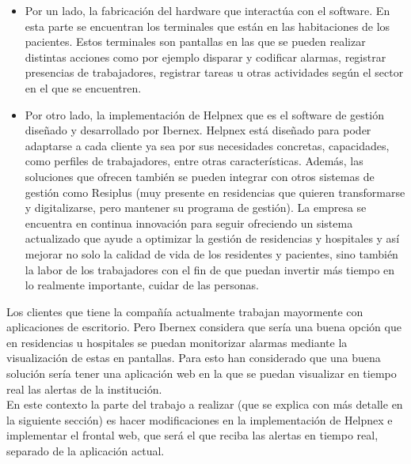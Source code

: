\begin{itemize}
    \item Por un lado, la fabricación del hardware que interactúa con el software. En esta parte se encuentran los terminales que están en las habitaciones de los pacientes. Estos terminales son pantallas en las que se pueden realizar distintas acciones como por ejemplo disparar y codificar alarmas, registrar presencias de trabajadores, registrar tareas u otras actividades según el sector en el que se encuentren.
    \item Por otro lado, la implementación de Helpnex que es el software de gestión diseñado y desarrollado por Ibernex. Helpnex está diseñado para poder adaptarse a cada cliente ya sea por sus necesidades concretas, capacidades, como perfiles de trabajadores, entre otras características.
    Además, las soluciones que ofrecen también se pueden integrar con otros sistemas de gestión como Resiplus (muy presente en residencias que quieren transformarse y digitalizarse, pero mantener su programa de gestión). 
    La empresa se encuentra en continua innovación para seguir ofreciendo un sistema actualizado que ayude a optimizar la gestión de residencias y hospitales y así mejorar no solo la calidad de vida de los residentes y pacientes, sino también la labor de los trabajadores con el fin de que puedan invertir más tiempo en lo realmente importante, cuidar de las personas.
\end{itemize}



Los clientes que tiene la compañía actualmente trabajan mayormente con aplicaciones de escritorio. Pero Ibernex considera que sería una buena opción que en residencias u hospitales se puedan monitorizar alarmas mediante la visualización de estas en pantallas. Para esto han considerado que una buena solución sería tener una aplicación web en la que se puedan visualizar en tiempo real las alertas de la institución.\\

En este contexto la parte del trabajo a realizar (que se explica con más detalle en la siguiente sección) es hacer modificaciones en la implementación de Helpnex e implementar el frontal web, que será el que reciba las alertas en tiempo real, separado de la aplicación actual.


